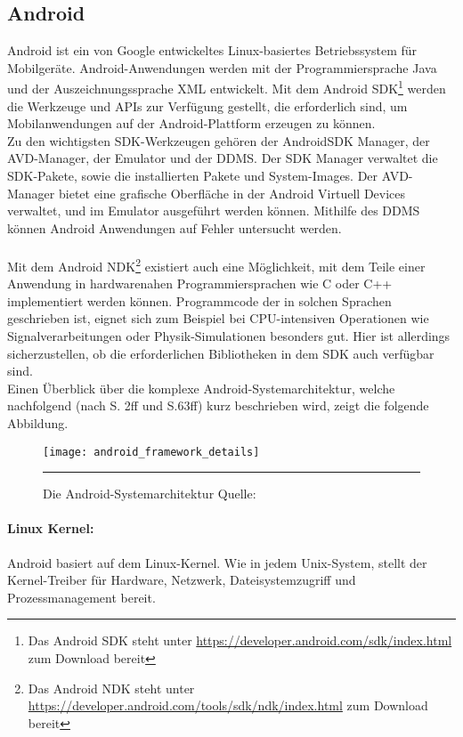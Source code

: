 \subsection{Android}
Android ist ein von Google entwickeltes Linux-basiertes Betriebssystem für Mobilgeräte. 
Android-Anwendungen werden mit der Programmiersprache Java und der Auszeichnungssprache \gls{XML} entwickelt. Mit dem Android \gls{SDK}\footnote{ Das Android \gls{SDK} steht unter \url{https://developer.android.com/sdk/index.html} zum Download bereit} werden die Werkzeuge und \glspl{API} zur Verfügung gestellt, die erforderlich sind, um Mobilanwendungen auf der Android-Plattform erzeugen zu können.\\ 
Zu den wichtigsten \gls{SDK}-Werkzeugen gehören der Android\gls{SDK} Manager, der AVD-Manager, der Emulator und der \gls{DDMS}. Der \gls{SDK} Manager verwaltet die \gls{SDK}-Pakete, sowie die installierten Pakete und System-Images. Der AVD-Manager bietet eine grafische Oberfläche in der Android Virtuell Devices verwaltet, und im Emulator ausgeführt werden können. Mithilfe des \gls{DDMS} können Android Anwendungen auf Fehler untersucht werden. \cite{android_sdk} \\\\
Mit dem Android \gls{NDK}\footnote{ Das Android \gls{NDK} steht unter \url{https://developer.android.com/tools/sdk/ndk/index.html} zum Download bereit} existiert auch eine Möglichkeit, mit dem Teile einer Anwendung in hardwarenahen Programmiersprachen wie C oder C++ implementiert werden können. Programmcode der in solchen Sprachen geschrieben ist, eignet sich zum Beispiel bei CPU-intensiven Operationen wie Signalverarbeitungen oder Physik-Simulationen besonders gut. Hier ist allerdings sicherzustellen, ob die erforderlichen Bibliotheken in dem \gls{SDK} auch verfügbar sind. \cite{android_ndk} \\
Einen Überblick über die komplexe Android-Systemarchitektur, welche nachfolgend (nach \cite{android} S. 2ff und \cite{androidVM} S.63ff) kurz beschrieben wird, zeigt die folgende Abbildung.
\begin{figure}[H]  
    \centering  
    \texttt{[image: android\_framework\_details]} 
    \rule{35em}{0.5pt}
    \caption[Android-Systemarchitektur]{Die Android-Systemarchitektur Quelle: \cite{android_fig}}
    \label{fig:android}
\end{figure}
\paragraph{Linux Kernel: }
Android basiert auf dem Linux-Kernel. Wie in jedem Unix-System, stellt der Kernel-Treiber für Hardware, Netzwerk, Dateisystemzugriff und Prozessmanagement bereit.
